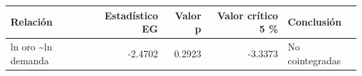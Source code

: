 \begin{tabular}{lrrrl}
\toprule
Relación & Estadístico EG & Valor p & Valor crítico 5 \% & Conclusión \\
\midrule
ln oro \textasciitilde \space ln demanda & -2.4702 & 0.2923 & -3.3373 & No cointegradas \\
\bottomrule
\end{tabular}
